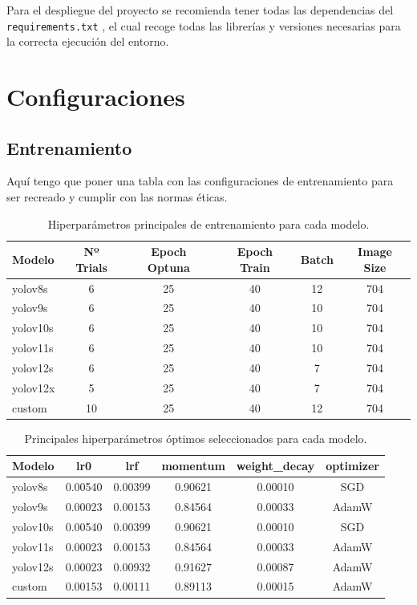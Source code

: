 \documentclass[12pt,a4paper,onecolumn,oneside]{report}
\begin{document}
Para el despliegue del proyecto se recomienda tener todas las dependencias del \texttt{requirements.txt} \cite{repoTFM}, el cual 
recoge todas las librerías y versiones necesarias para la correcta ejecución del entorno.

\section{Configuraciones}
\label{sec:Configuraciones}

\subsection{Entrenamiento}

Aquí tengo que poner una tabla con las configuraciones de entrenamiento para ser recreado y cumplir con las normas éticas.

\begin{table}[H]
\centering
\begin{tabular}{|l|c|c|c|c|c|}
\hline
\textbf{Modelo} & \textbf{Nº Trials} & \textbf{Epoch Optuna} & \textbf{Epoch Train} & \textbf{Batch} & \textbf{Image Size} \\
\hline
yolov8s   & 6  & 25 & 40 & 12 & 704 \\
yolov9s   & 6  & 25 & 40 & 10 & 704 \\
yolov10s  & 6  & 25 & 40 & 10 & 704 \\
yolov11s  & 6  & 25 & 40 & 10 & 704 \\
yolov12s  & 6  & 25 & 40 & 7 & 704 \\
yolov12x  & 5  & 25 & 40 & 7 & 704 \\
custom    & 10 & 25 & 40 & 12 & 704 \\
\hline
\end{tabular}
\caption{Hiperparámetros principales de entrenamiento para cada modelo.}
\end{table}


\begin{table}[H]
\centering
\begin{tabular}{|l|c|c|c|c|c|}
\hline
\textbf{Modelo} & \textbf{lr0} & \textbf{lrf} & \textbf{momentum} & \textbf{weight\_decay} & \textbf{optimizer} \\
\hline
yolov8s   & 0.00540 & 0.00399 & 0.90621 & 0.00010 & SGD \\ \hline
yolov9s   & 0.00023 & 0.00153 & 0.84564 & 0.00033 & AdamW \\
yolov10s  & 0.00540 & 0.00399 & 0.90621 & 0.00010 & SGD \\
yolov11s  & 0.00023 & 0.00153 & 0.84564 & 0.00033 & AdamW \\
yolov12s  & 0.00023 & 0.00932 & 0.91627 & 0.00087 & AdamW \\
custom    & 0.00153 & 0.00111 & 0.89113 & 0.00015 & AdamW \\
\hline
\end{tabular}
\caption{Principales hiperparámetros óptimos seleccionados para cada modelo.}
\end{table}
\end{document}

